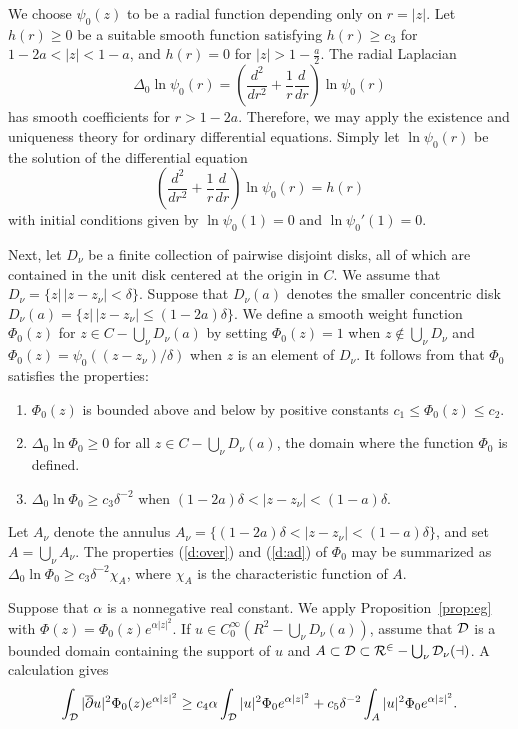 \begin{pf}
We choose $\psi_0(z)$ to be a radial function depending only on
$r=|z|$. Let $h(r)\geq 0$ be a suitable smooth function satisfying $h(r)\geq
c_3$ for $1-2a<|z|<1-a$, and $h(r)=0$ for $|z|>1-\tfrac a2$. The radial
Laplacian
\[\Delta_0\ln\psi_0(r)=\left(\frac {d^2}{dr^2}+\frac
1r\frac d{dr}\right)\ln\psi_0(r)\]
has smooth coefficients for $r>1-2a$. Therefore, we may
apply the existence and uniqueness theory for ordinary differential
equations. Simply let $\ln \psi_0(r)$ be the solution of the differential
equation
\[(\frac{d^2}{dr^2}+\frac 1r\frac d{dr})\ln \psi_0(r)=h(r)\] with initial
conditions given by $\ln \psi_0(1)=0$ and $\ln\psi_0'(1)=0$.

Next, let $D_\nu$ be a finite collection of pairwise disjoint disks,
all of which are contained in the unit disk centered at the origin in
$C$. We assume that $D_\nu=\{z|\,|z-z_\nu|<\delta\}$. Suppose that
$D_\nu(a)$ denotes the smaller concentric disk $D_\nu(a)=\{z|\,
|z-z_\nu|\leq (1-2a)\delta\}$. We define a smooth weight function
$\Phi_0(z)$ for $z\in C-\bigcup_\nu D_\nu(a)$ by setting $\Phi_
0(z)=1$ when $z\notin \bigcup_\nu D_\nu$ and $\Phi_
0(z)=\psi_0((z-z_\nu)/\delta)$ when $z$ is an element of $D_\nu$. It
follows from  that $\Phi_ 0$ satisfies the properties:
\begin{enumerate}
\renewcommand{\labelenumi}{(\roman{enumi})}
\item \label{boundab}$\Phi_ 0(z)$ is bounded above and below by
positive constants $c_1\leq \Phi_ 0(z)\leq c_2$.
\item \label{d:over}$\Delta_0\ln\Phi_ 0\geq 0$ for all
$z\in C-\bigcup_\nu D_\nu(a)$,
the domain where the function $\Phi_ 0$ is defined.
\item \label{d:ad}$\Delta_0\ln\Phi_ 0\geq c_3\delta^{-2}$
when $(1-2a)\delta<|z-z_\nu|<(1-a)\delta$.
\end{enumerate}
Let $A_\nu$ denote the annulus $A_\nu=\{(1-2a)\delta<|z-z_\nu|<(1-a)
\delta \}$, and set $A=\bigcup_\nu A_\nu$. The
properties (\ref{d:over}) and (\ref{d:ad}) of $\Phi_ 0$
may be summarized as $\Delta_0\ln \Phi_ 0\geq c_3\delta^{-2}\chi_A$,
where $\chi _A$ is the characteristic function of $A$.
\end{pf}

Suppose that $\alpha$ is a nonnegative real constant. We apply
Proposition~\ref{prop:eg}
with $\Phi(z)=\Phi_ 0(z) e^{\alpha|z|^2}$. If $u\in C^\infty_0(R^2-\bigcup_\nu
D_\nu(a))$, assume that $\cal D$ is a bounded domain containing the  support of
$u$ and $A\subset \cal D\subset R^2-\bigcup_\nu D_\nu(a)$. A calculation gives
\[\int_{\cal D}|\overline\partial u|^2\Phi_ 0(z) e^{\alpha|z|^2}\geq c_4\alpha
\int_{\cal D}|u|^2\Phi_ 0e^{\alpha|z|^2}+c_5\delta^{-2}\int_ A|u|^2\Phi_ 0e^{
\alpha|z|^2}.\]

